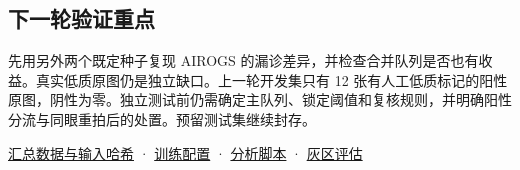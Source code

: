 \documentclass[
  10pt,
]{article}
\begin{document}
\subsection{下一轮验证重点}\label{ux4e0bux4e00ux8f6eux9a8cux8bc1ux91cdux70b9}

先用另外两个既定种子复现 AIROGS
的漏诊差异，并检查合并队列是否也有收益。真实低质原图仍是独立缺口。上一轮开发集只有
12
张有人工低质标记的阳性原图，阴性为零。独立测试前仍需确定主队列、锁定阈值和复核规则，并明确阳性分流与同眼重拍后的处置。预留测试集继续封存。

\href{backbone-results.json}{汇总数据与输入哈希} ·
\href{../../../configs/backbone_20261118/resnet50.json}{训练配置} ·
\href{../../../tools/analyze_matched_backbones_20261118.py}{分析脚本} ·
\href{gray-zone.zh.md}{灰区评估}
\end{document}
